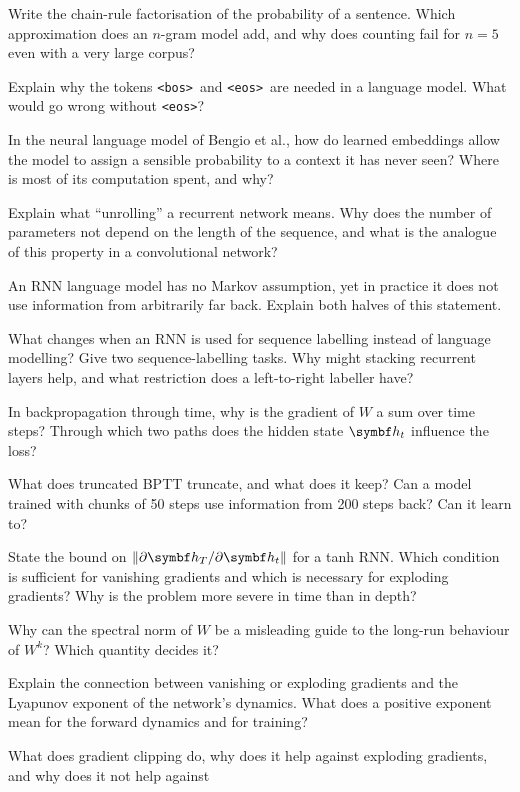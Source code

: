 \documentclass[11pt]{article}
\newcommand{\hv}{\vect{h}}
\newcommand{\bos}{\texttt{<bos>}}
\newcommand{\eos}{\texttt{<eos>}}
\begin{document}
\begin{questions}
\begin{conceptual}
\item Write the chain-rule factorisation of the probability of a sentence. Which approximation does an $n$-gram model add,
  and why does counting fail for $n = 5$ even with a very large corpus?
\item Explain why the tokens \bos\ and \eos\ are needed in a language model. What would go wrong without \eos?
\item In the neural language model of Bengio et al., how do learned embeddings allow the model to assign a sensible
  probability to a context it has never seen? Where is most of its computation spent, and why?
\item Explain what ``unrolling'' a recurrent network means. Why does the number of parameters not depend on the length of
  the sequence, and what is the analogue of this property in a convolutional network?
\item An RNN language model has no Markov assumption, yet in practice it does not use information from arbitrarily far back.
  Explain both halves of this statement.
\item What changes when an RNN is used for sequence labelling instead of language modelling? Give two sequence-labelling
  tasks. Why might stacking recurrent layers help, and what restriction does a left-to-right labeller have?
\item In backpropagation through time, why is the gradient of $W$ a sum over time steps? Through which two paths does the
  hidden state $\hv_t$ influence the loss?
\item What does truncated BPTT truncate, and what does it keep? Can a model trained with chunks of 50 steps use information
  from 200 steps back? Can it learn to?
\item State the bound on $\norm{\partial\hv_T/\partial\hv_t}$ for a tanh RNN. Which condition is sufficient for vanishing
  gradients and which is necessary for exploding gradients? Why is the problem more severe in time than in depth?
\item Why can the spectral norm of $W$ be a misleading guide to the long-run behaviour of $W^k$? Which quantity decides it?
\item Explain the connection between vanishing or exploding gradients and the Lyapunov exponent of the network's dynamics.
  What does a positive exponent mean for the forward dynamics and for training?
\item What does gradient clipping do, why does it help against exploding gradients, and why does it not help against

\end{conceptual}
\end{questions}
\end{document}
